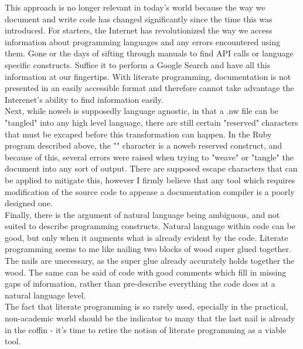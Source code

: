 \documentclass{article}
\begin{document}
This approach is no longer relevant in today's world because the way we document and write code has changed significantly since the time this was introduced. For starters, the Internet has revolutionized the way we access information about programming languages and any errors encountered using them. Gone or the days of sifting through manuals to find API calls or language specific constructs. Suffice it to perform a Google Search and have all this information at our fingertips. With literate programming, documentation is not presented in an easily accessible format and therefore cannot take advantage the Interenet's ability to find information easily.\\

Next, while noweb is supposedly language agnostic, in that a .nw file can be "tangled" into any high level language, there are still certain "reserved" characters that must be excaped before this transformation can happen. In the Ruby program described above, the "\textlangle \textlangle" character is a noweb reserved construct, and because of this, several errors were raised when trying to "weave" or "tangle" the document into any sort of output. There are supposed escape characters that can be applied to mitigate this, however I firmly believe that any tool which requires modification of the source code to appease a documentation compiler is a poorly designed one.\\

Finally, there is the argument of natural language being ambiguous, and not suited to describe programming constructs. Natural language within code can be good, but only when it augments what is already evident by the code. Literate programming seems to me like nailing two blocks of wood super glued together. The nails are unecessary, as the super glue already accurately holds together the wood. The same can be said of code with good comments which fill in missing gaps of information, rather than pre-describe everything the code does at a natural language level.\\

The fact that literate programming is so rarely used, epecially in the practical, non-academic world should be the indicator to many that the last nail is already in the coffin - it's time to retire the notion of literate programming as a viable tool.
\end{document}
